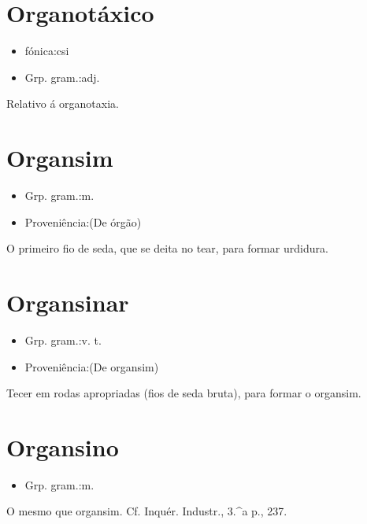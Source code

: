 \section{Organotáxico}
\begin{itemize}
\item {fónica:csi}
\end{itemize}
\begin{itemize}
\item {Grp. gram.:adj.}
\end{itemize}
Relativo á organotaxia.
\section{Organsim}
\begin{itemize}
\item {Grp. gram.:m.}
\end{itemize}
\begin{itemize}
\item {Proveniência:(De \textunderscore órgão\textunderscore )}
\end{itemize}
O primeiro fio de seda, que se deita no tear, para formar urdidura.
\section{Organsinar}
\begin{itemize}
\item {Grp. gram.:v. t.}
\end{itemize}
\begin{itemize}
\item {Proveniência:(De \textunderscore organsim\textunderscore )}
\end{itemize}
Tecer em rodas apropriadas (fios de seda bruta), para formar o organsim.
\section{Organsino}
\begin{itemize}
\item {Grp. gram.:m.}
\end{itemize}
O mesmo que \textunderscore organsim\textunderscore . Cf. \textunderscore Inquér. Industr.\textunderscore , 3.^a p., 237.
